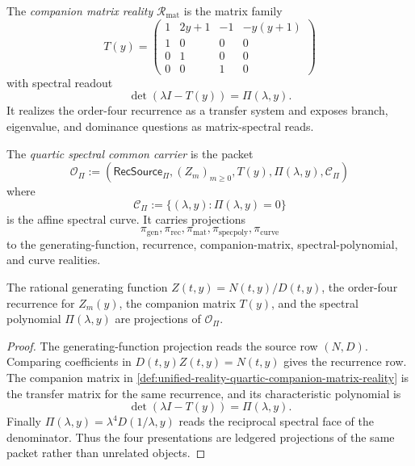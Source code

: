 \begin{definition}
\label{def:unified-reality-quartic-companion-matrix-reality}
The \emph{companion matrix reality} $\mathcal R_{\mathrm{mat}}$ is the
matrix family
$$
T(y)
=
\begin{pmatrix}
1&2y+1&-1&-y(y+1)\\
1&0&0&0\\
0&1&0&0\\
0&0&1&0
\end{pmatrix}
$$
with spectral readout
$$
\det(\lambda I-T(y))=\Pi(\lambda,y).
$$
It realizes the order-four recurrence as a transfer system and exposes
branch, eigenvalue, and dominance questions as matrix-spectral reads.
\end{definition}

\begin{definition}
\label{def:unified-reality-quartic-spectral-common-carrier}
The \emph{quartic spectral common carrier} is the packet
$$
\mathcal O_{\Pi}
:=
(\mathsf{RecSource}_{\Pi},(Z_m)_{m\ge0},T(y),\Pi(\lambda,y),
\mathcal C_{\Pi})
$$
where
$$
\mathcal C_{\Pi}
:=
\{(\lambda,y):\Pi(\lambda,y)=0\}
$$
is the affine spectral curve. It carries projections
$$
\pi_{\mathrm{gen}},
\pi_{\mathrm{rec}},
\pi_{\mathrm{mat}},
\pi_{\mathrm{specpoly}},
\pi_{\mathrm{curve}}
$$
to the generating-function, recurrence, companion-matrix,
spectral-polynomial, and curve realities.
\end{definition}

\begin{theorem}
\label{thm:unified-reality-quartic-shared-recurrence-spectral-carrier}
The rational generating function $Z(t,y)=N(t,y)/D(t,y)$, the order-four
recurrence for $Z_m(y)$, the companion matrix $T(y)$, and the spectral
polynomial $\Pi(\lambda,y)$ are projections of
$\mathcal O_{\Pi}$.
\end{theorem}

\begin{proof}
The generating-function projection reads the source row
$(N,D)$. Comparing coefficients in $D(t,y)Z(t,y)=N(t,y)$ gives the
recurrence row. The companion matrix in
\autoref{def:unified-reality-quartic-companion-matrix-reality} is the
transfer matrix for the same recurrence, and its characteristic
polynomial is
$$
\det(\lambda I-T(y))=\Pi(\lambda,y).
$$
Finally $\Pi(\lambda,y)=\lambda^4D(1/\lambda,y)$ reads the reciprocal
spectral face of the denominator. Thus the four presentations are
ledgered projections of the same packet rather than unrelated objects.
\end{proof}


